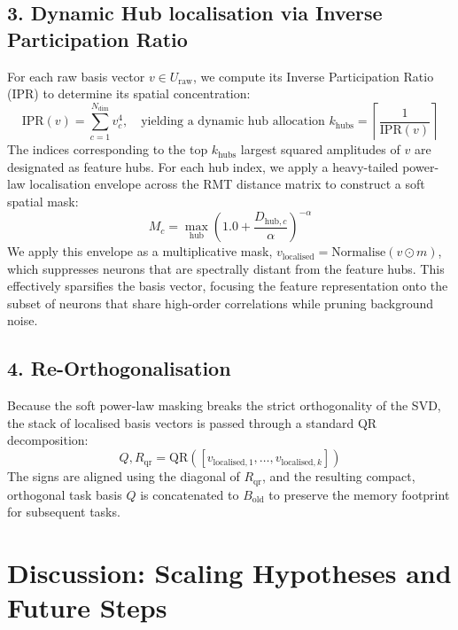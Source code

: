 \documentclass[10pt,a4paper]{article}
\begin{document}
	\subsection{3. Dynamic Hub localisation via Inverse Participation Ratio}
	For each raw basis vector $v \in U_{\text{raw}}$, we compute its Inverse Participation Ratio (IPR) to determine its spatial concentration:
	\begin{equation}
		\text{IPR}(v) = \sum_{c=1}^{N_{\text{dim}}} v_c^4, \quad \text{yielding a dynamic hub allocation } k_{\text{hubs}} = \left\lceil \frac{1}{\text{IPR}(v)} \right\rceil
	\end{equation}
	The indices corresponding to the top $k_{\text{hubs}}$ largest squared amplitudes of $v$ are designated as feature hubs. For each hub index, we apply a heavy-tailed power-law localisation envelope across the RMT distance matrix to construct a soft spatial mask:
	\begin{equation}
		M_c = \max_{\text{hub}} \left( 1.0 + \frac{D_{\text{hub}, c}}{\alpha} \right)^{-\alpha}
	\end{equation}
	We apply this envelope as a multiplicative mask, $v_{\text{localised}} = \text{Normalise}(v \odot m)$, which suppresses neurons that are spectrally distant from the feature hubs. This effectively sparsifies the basis vector, focusing the feature representation onto the subset of neurons that share high-order correlations while pruning background noise.
	
	\subsection{4. Re-Orthogonalisation}
	Because the soft power-law masking breaks the strict orthogonality of the SVD, the stack of localised basis vectors is passed through a standard QR decomposition:
	\begin{equation}
		Q, R_{\text{qr}} = \text{QR}([v_{\text{localised}, 1}, \dots, v_{\text{localised}, k}])
	\end{equation}
	The signs are aligned using the diagonal of $R_{\text{qr}}$, and the resulting compact, orthogonal task basis $Q$ is concatenated to $B_{\text{old}}$ to preserve the memory footprint for subsequent tasks.
	
	\section{Discussion: Scaling Hypotheses and Future Steps}
	
\end{document}
